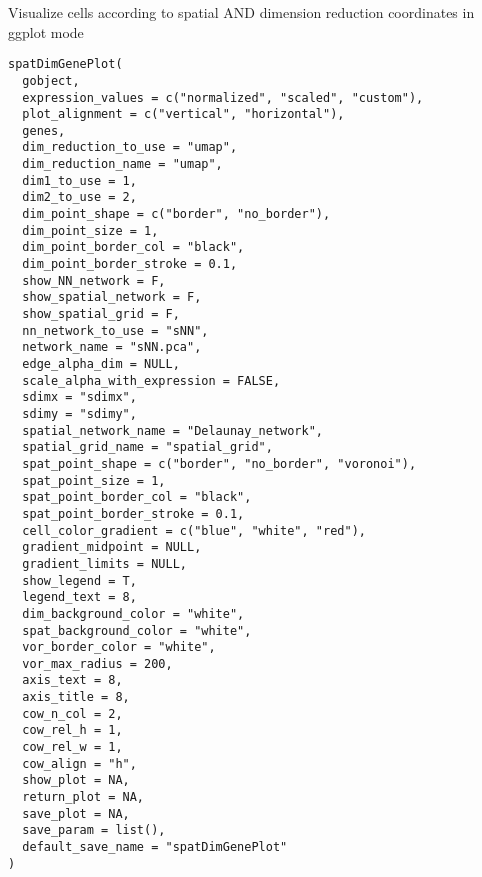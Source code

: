 \documentclass[a4paper]{book}
\begin{document}
%
\begin{Description}\relax
Visualize cells according to spatial AND dimension reduction coordinates in ggplot mode
\end{Description}
%
\begin{Usage}
\begin{verbatim}
spatDimGenePlot(
  gobject,
  expression_values = c("normalized", "scaled", "custom"),
  plot_alignment = c("vertical", "horizontal"),
  genes,
  dim_reduction_to_use = "umap",
  dim_reduction_name = "umap",
  dim1_to_use = 1,
  dim2_to_use = 2,
  dim_point_shape = c("border", "no_border"),
  dim_point_size = 1,
  dim_point_border_col = "black",
  dim_point_border_stroke = 0.1,
  show_NN_network = F,
  show_spatial_network = F,
  show_spatial_grid = F,
  nn_network_to_use = "sNN",
  network_name = "sNN.pca",
  edge_alpha_dim = NULL,
  scale_alpha_with_expression = FALSE,
  sdimx = "sdimx",
  sdimy = "sdimy",
  spatial_network_name = "Delaunay_network",
  spatial_grid_name = "spatial_grid",
  spat_point_shape = c("border", "no_border", "voronoi"),
  spat_point_size = 1,
  spat_point_border_col = "black",
  spat_point_border_stroke = 0.1,
  cell_color_gradient = c("blue", "white", "red"),
  gradient_midpoint = NULL,
  gradient_limits = NULL,
  show_legend = T,
  legend_text = 8,
  dim_background_color = "white",
  spat_background_color = "white",
  vor_border_color = "white",
  vor_max_radius = 200,
  axis_text = 8,
  axis_title = 8,
  cow_n_col = 2,
  cow_rel_h = 1,
  cow_rel_w = 1,
  cow_align = "h",
  show_plot = NA,
  return_plot = NA,
  save_plot = NA,
  save_param = list(),
  default_save_name = "spatDimGenePlot"
)
\end{verbatim}
\end{Usage}
%
\end{document}
